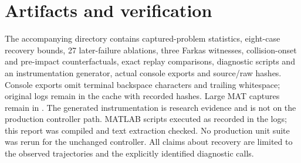 \documentclass[11pt]{article}
\begin{document}
\section{Artifacts and verification}
The accompanying directory
contains captured-problem statistics, eight-case recovery bounds,
27 later-failure ablations, three Farkas witnesses, collision-onset and
pre-impact counterfactuals, exact replay comparisons, diagnostic scripts and an instrumentation generator,
actual console exports and source/raw hashes. Console exports omit terminal
backspace characters and trailing whitespace; original logs remain in the
cache with recorded hashes. Large MAT captures remain in
.
The generated instrumentation is research evidence and is not on the production
controller path. MATLAB scripts executed as recorded in the logs; this report
was compiled and text extraction checked. No production unit suite was rerun
for the unchanged controller. All claims about recovery are limited to the
observed trajectories and the explicitly identified diagnostic calls.
\end{document}
